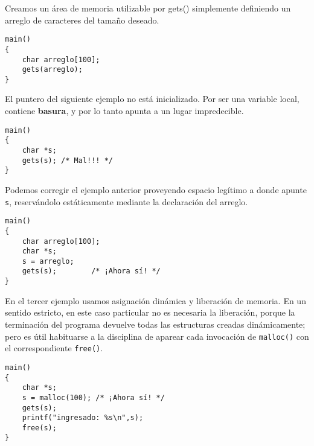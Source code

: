 \begin{ejemplo}

Creamos un área de memoria utilizable por gets() simplemente definiendo un arreglo de caracteres del tamaño deseado. 
\begin{lstlisting}
main()
{
    char arreglo[100];
    gets(arreglo);
}
\end{lstlisting}

El puntero del siguiente ejemplo no está inicializado. Por ser una variable local,
contiene \textbf{basura}, y por lo tanto apunta a un lugar impredecible.
\begin{lstlisting}
main()
{
    char *s;
    gets(s); /* Mal!!! */
}
\end{lstlisting}

Podemos corregir el ejemplo anterior proveyendo espacio legítimo a donde apunte \lstinline{s}, reservándolo
estáticamente mediante la declaración del arreglo.

\begin{lstlisting}
main()
{
    char arreglo[100];
    char *s;
    s = arreglo;
    gets(s); 		/* ¡Ahora sí! */
}
\end{lstlisting}

En el tercer ejemplo usamos asignación dinámica y liberación de memoria. En un
sentido estricto, en este caso particular no es necesaria la liberación, porque
la terminación del programa devuelve todas las estructuras creadas
dinámicamente; pero es útil habituarse a la disciplina de aparear cada
invocación de \lstinline{malloc()} con el correspondiente \lstinline{free()}.

\begin{lstlisting}
main()
{
    char *s;
    s = malloc(100); /* ¡Ahora sí! */
    gets(s);
    printf("ingresado: %s\n",s);
    free(s);
}
\end{lstlisting}
\end{ejemplo}

